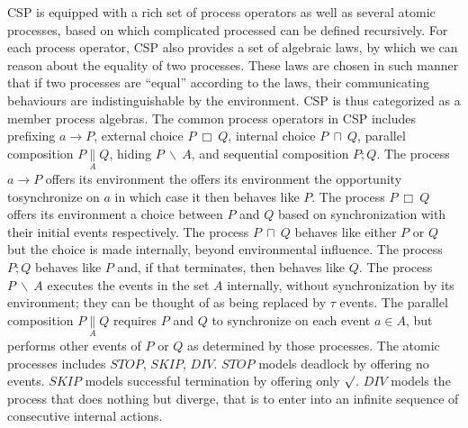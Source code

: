 \documentclass{llncs}
\newcommand{\csppre}[2]{#1 \rightarrow #2}
\newcommand{\cspint}[2]{#1\ \sqcap\ #2}
\newcommand{\cspext}[2]{#1\ \Box\ #2}
\newcommand{\cspseq}[2]{#1; #2}
\newcommand{\csppara}[3]{#1 \underset{#2}{\parallel} #3}
\newcommand{\csphide}[2]{#1\ \backslash\ #2}
\newcommand{\csptick}{\surd}
\newcommand{\csptau}{\tau}
\begin{document}
CSP is equipped with a rich set of process operators as well as several atomic
processes, based on which complicated processed can be defined recursively.
For each process operator, CSP also provides a set of algebraic
laws, by which we can reason about the equality of two processes.
These laws are chosen in such manner that if two processes are ``equal'' according
to the laws, their communicating behaviours are indistinguishable by the
environment. CSP is thus categorized as a member process algebras. The
common process operators in CSP includes prefixing $\csppre{a}{P}$, external
choice $\cspext{P}{Q}$, internal choice $\cspint{P}{Q}$, parallel composition
$\csppara{P}{A}{Q}$, hiding $\csphide{P}{A}$, and sequential composition
$\cspseq{P}{Q}$. The process $\csppre{a}{P}$ offers its environment the
offers its environment the opportunity tosynchronize on $a$ in which case it
then behaves like $P$. The process $\cspext{P}{Q}$ offers its environment
a choice between $P$ and $Q$ based on synchronization with their initial
events respectively. The process $\cspint{P}{Q}$ behaves like either $P$ or
$Q$ but the choice is made internally, beyond environmental influence. The
process $\cspseq{P}{Q}$ behaves like $P$ and, if that terminates, then
behaves like $Q$. The process $\csphide{P}{A}$ executes the events in the
set $A$ internally, without synchronization by its environment; they can
be thought of as being replaced by $\csptau$ events. The parallel composition
$\csppara{P}{A}{Q}$ requires $P$ and $Q$ to synchronize on each event $a
\in A$, but performs other events of $P$ or $Q$ as determined by those
processes. The atomic processes includes $STOP$, $SKIP$, $DIV$. $STOP$ models
deadlock by offering no events. $SKIP$ models successful termination by
offering only $\csptick$. $DIV$ models the process that does nothing but
diverge, that is to enter into an infinite sequence of consecutive internal actions.
\end{document}
